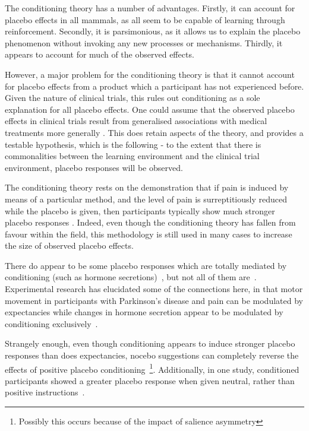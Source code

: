 The conditioning theory has a number of advantages. Firstly, it can account for placebo effects in all mammals, as all seem to be capable of learning through reinforcement. Secondly, it is parsimonious, as it allows us to explain the placebo phenomenon without invoking any new processes or mechanisms. Thirdly, it appears to account for much of the observed effects. 

However, a major problem for the conditioning theory is that it cannot account for placebo effects from a product which a participant  has not experienced before. Given the nature of clinical trials, this rules out   conditioning as a sole explanation for all placebo effects.  One could assume that the observed placebo effects in clinical trials result from generalised associations with medical treatments more generally \cite{pearce1987model}. This does retain aspects of the theory, and provides a testable hypothesis, which is the following - to the extent that there is commonalities between the learning environment and the clinical trial environment, placebo responses will be observed.  

The conditioning theory rests on the demonstration that if pain is induced by means of a particular method, and the level of pain is surreptitiously reduced while the placebo is given, then participants typically show much stronger placebo responses \cite{Voudouris1985,Colloca2006}. Indeed, even though the conditioning theory has fallen from favour within the field, this methodology is still used in many cases to increase the size of observed placebo effects. 


There do appear to be some placebo responses which are totally mediated by conditioning (such as hormone secretions)~\cite{Amanzio1999}, but not all of them are~\cite{benedetti2003a}. Experimental research has elucidated some of the connections here, in that motor movement in participants with Parkinson's disease and pain can be modulated by expectancies while changes in hormone secretion appear to be modulated by conditioning exclusively~\cite{benedetti2003a}.

Strangely enough, even though conditioning appears to induce stronger placebo responses than does expectancies, nocebo suggestions can completely reverse the effects of positive placebo conditioning~\cite{Benedetti2008}\footnote{Possibly this occurs because of the impact of salience asymmetry}. Additionally, in one study, conditioned participants showed a greater placebo response when given neutral, rather than positive instructions~\cite{Klinger2007a}. 

